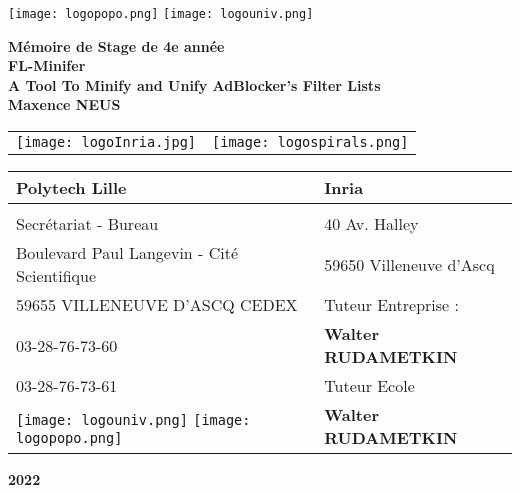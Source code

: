 \documentclass[oneside,a4paper,12pt]{article}
\begin{document}
	\begin{titlepage}
		\texttt{[image: logopopo.png]}
		\hspace*{\fill}
		\texttt{[image: logouniv.png]}
		
		\begin{center}
			\vspace{1cm}
			\textbf{Mémoire de Stage de 4e année}\\
			\vspace{1cm}
			\textbf{\LARGE FL-Minifer}\\
			\textbf{\large A Tool To Minify and Unify AdBlocker’s Filter Lists}\\
			\vspace{1cm}
			\textbf{Maxence NEUS}\\
			\vspace{1cm}
			\begin{tabular}{ c c }
				\texttt{[image: logoInria.jpg]} & \texttt{[image: logospirals.png]}\\
			\end{tabular}

			\vspace{2cm}

			\begin{tabular}{ m{6cm} | m{6cm} }
				\textbf{Polytech Lille} & \textbf{Inria} \\
				\hline
				& \\
				Secrétariat - Bureau & 40 Av. Halley \\
				Boulevard Paul Langevin - Cité Scientifique & 59650 Villeneuve d'Ascq \\
				59655 VILLENEUVE D’ASCQ CEDEX & Tuteur Entreprise : \\
				03-28-76-73-60 & \textbf{Walter RUDAMETKIN} \\
				03-28-76-73-61 & Tuteur Ecole \\
				\texttt{[image: logouniv.png]} \texttt{[image: logopopo.png]} & \textbf{Walter RUDAMETKIN} \\
				
			\end{tabular}
			
			\vspace{\fill}
			\textbf{2022}\\
		\end{center}
	\end{titlepage}

\tableofcontents

\newpage
\end{document}
